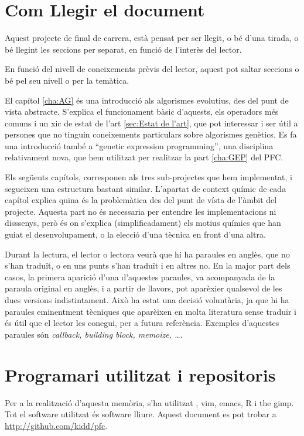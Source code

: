 \section{Com Llegir el document} %
\label{sec:Com Llegir el document}
Aquest projecte de final de carrera, està pensat per ser llegit, o bé d'una
tirada, o bé llegint les seccions per separat, en funció de l'interès del
lector.

En funció del nivell de coneixements prèvis del lector, aquest pot saltar
seccions o bé pel seu nivell o per la temàtica.

El capítol \ref{cha:AG} és una introducció als algorismes evolutius, des del
punt de vista abstracte.  S'explica el funcionament bàsic d'aquests, els
operadors més comuns i un xic de estat de l'art \ref{sec:Estat de l'art}, que
pot interessar i ser útil a persones que no tinguin coneixements particulars
sobre algorismes genètics.  Es fa una introducció també a ``genetic expression
programming'', una disciplina relativament nova, que hem utilitzat per realitzar
la part \ref{cha:GEP} del PFC.

Els següents capítols, corresponen als tres sub-projectes que hem implementat, i
segueixen una estructura bastant similar.  L'apartat de context químic de cada
capítol explica quina és la problemàtica des del punt de vísta de l'àmbit del
projecte.  Aquesta part no és necessaria per entendre les implementacions ni
disssenys, però és on s'explica (simplificadament) els motius químics que han
guiat el desenvolupament, o la elecció d'una tècnica en front d'una altra.

Durant la lectura, el lector o lectora veurà que hi ha paraules en anglès, que
no s'han traduït, o en uns punts s'han traduït i en altres no.  En la major part
dels casos, la primera aparició d'una d'aquestes paraules, va acompanyada de la
paraula original en anglès, i a partir de llavors, pot aparèxier qualsevol de
les dues versions indistintament.  Això ha estat una decisió voluntària, ja que
hi ha paraules eminentment tècniques que aparèixen en molta literatura sense
traduïr i és útil que el lector les conegui, per a futura referència.  Exemples
d'aquestes paraules són \emph{callback, building block, memoize, \ldots}.

\section{Programari utilitzat i repositoris} %
\label{sec:Programari utilitzat}

Per a la realització d'aquesta memòria, s'ha utilitzat \latex, vim, emacs, R i
the gimp.  Tot el software utilitzat és software lliure.  Aquest document es pot
trobar a \url{http://github.com/kidd/pfc}. 

